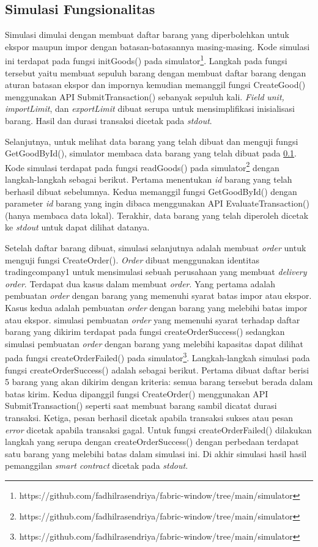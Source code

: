 \subsection{Simulasi Fungsionalitas}
\label{subsec:init-good}
Simulasi dimulai dengan membuat daftar barang yang diperbolehkan untuk ekspor maupun impor dengan batasan-batasannya masing-masing. Kode simulasi ini terdapat pada fungsi initGoods() pada simulator\footnote{https://github.com/fadhilrasendriya/fabric-window/tree/main/simulator}. Langkah pada fungsi tersebut yaitu membuat sepuluh barang dengan membuat daftar barang dengan aturan batasan ekspor dan impornya kemudian memanggil fungsi CreateGood() menggunakan API SubmitTransaction() sebanyak sepuluh kali. \textit{Field} \textit{unit, importLimit}, dan \textit{exportLimit} dibuat serupa untuk mensimplifikasi inisialisasi barang. Hasil dan durasi transaksi dicetak pada \textit{stdout}.

Selanjutnya, untuk melihat data barang yang telah dibuat dan menguji fungsi GetGoodById(), simulator membaca data barang yang telah dibuat pada \ref{subsec:init-good}. Kode simulasi terdapat pada fungsi readGoods() pada simulator\footnote{https://github.com/fadhilrasendriya/fabric-window/tree/main/simulator} dengan langkah-langkah sebagai berikut. Pertama menentukan \textit{id} barang yang telah berhasil dibuat sebelumnya. Kedua memanggil fungsi GetGoodById() dengan parameter \textit{id} barang yang ingin dibaca menggunakan API EvaluateTransaction() (hanya membaca data lokal). Terakhir, data barang yang telah diperoleh dicetak ke \textit{stdout} untuk dapat dilihat datanya.


Setelah daftar barang dibuat, simulasi selanjutnya adalah membuat \textit{order} untuk menguji fungsi CreateOrder(). \textit{Order} dibuat menggunakan identitas tradingcompany1 untuk mensimulasi sebuah perusahaan yang membuat \textit{delivery order}. Terdapat dua kasus dalam membuat \textit{order}. Yang pertama adalah pembuatan \textit{order} dengan barang yang memenuhi syarat batas impor atau ekspor. Kasus kedua adalah pembuatan \textit{order} dengan barang yang melebihi batas impor atau ekspor. simulasi pembuatan \textit{order} yang memenuhi syarat terhadap daftar barang yang dikirim terdapat pada fungsi createOrderSuccess() sedangkan simulasi pembuatan \textit{order} dengan barang yang melebihi kapasitas dapat dilihat pada fungsi createOrderFailed() pada simulator\footnote{https://github.com/fadhilrasendriya/fabric-window/tree/main/simulator}. Langkah-langkah simulasi pada fungsi createOrderSuccess() adalah sebagai berikut. Pertama dibuat daftar berisi 5 barang yang akan dikirim dengan kriteria: semua barang tersebut berada dalam batas kirim. Kedua dipanggil fungsi CreateOrder() menggunakan API SubmitTransaction() seperti saat membuat barang sambil dicatat durasi transaksi. Ketiga, pesan berhasil dicetak apabila transaksi sukses atau pesan \textit{error} dicetak apabila transaksi gagal. Untuk fungsi createOrderFailed() dilakukan langkah yang serupa dengan createOrderSuccess() dengan perbedaan terdapat satu barang yang melebihi batas dalam simulasi ini. Di akhir simulasi hasil hasil pemanggilan \textit{smart contract} dicetak pada \textit{stdout}.

